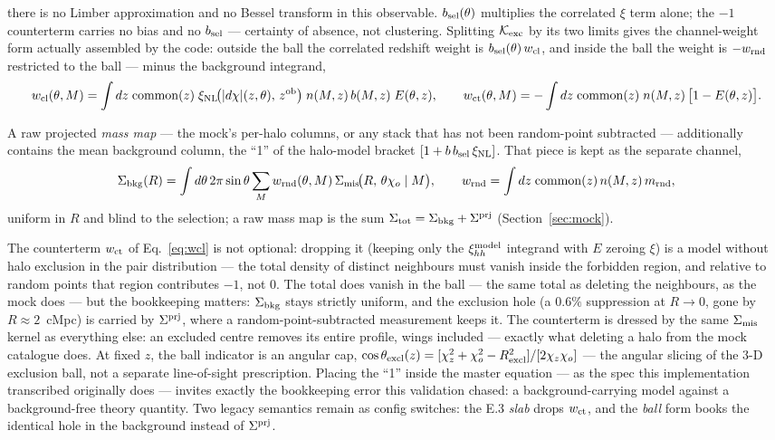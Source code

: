 there is no Limber approximation and no Bessel transform in this
observable. $b_{\rm sel}(\theta)$ multiplies the correlated $\xi$ term alone;
the $-1$ counterterm carries no bias and no $b_{\rm sel}$ --- certainty of
absence, not clustering. Splitting $\mathcal{K}_{\rm exc}$ by its two limits gives the
channel-weight form actually assembled by the code: outside the ball
the correlated redshift weight is $b_{\rm sel}(\theta)\,w_{\rm cl}$, and inside the
ball the weight is $-w_{\rm rnd}$ restricted to the ball --- minus the
background integrand,
\begin{equation}
w_{\rm cl}(\theta, M) = \int dz\;{\rm common}(z)\;
    \xi_{\rm NL}\!\big(|d\chi|(z,\theta),\, z^{\rm ob}\big)\;
    n(M, z)\, b(M, z)\; E(\theta, z),
\qquad
w_{\rm ct}(\theta, M) = -\int dz\;{\rm common}(z)\; n(M, z)\,
    \bigl[1 - E(\theta, z)\bigr].
\label{eq:wcl}
\end{equation}

A raw projected \emph{mass map} --- the mock's per-halo columns, or any
stack that has not been random-point subtracted --- additionally contains
the mean background column, the ``1'' of the halo-model bracket
$[1 + b\,b_{\rm sel}\,\xi_{\rm NL}]$. That piece is kept as the separate 
channel,
\begin{equation}
\Sigma_{\rm bkg}(R) = \int d\theta\, 2\pi\sin\theta
  \sum_M w_{\rm rnd}(\theta, M)\, \Sigma_{\rm mis}\!\big(R,\, \theta\chi_o \mid M\big),
\qquad
w_{\rm rnd} = \int dz\;{\rm common}(z)\, n(M, z)\, m_{\rm rnd},
\label{eq:wrnd}
\end{equation}
uniform in $R$ and blind to the selection; a raw mass map is the sum
$\Sigma_{\rm tot} = \Sigma_{\rm bkg} + \Sigma^{\rm prj}$ (Section~\ref{sec:mock}).

The counterterm $w_{\rm ct}$ of Eq.~\eqref{eq:wcl} is not optional:
dropping it (keeping only the $\xi_{hh}^{\rm model}$ integrand with $E$ zeroing
$\xi$) is a model without halo exclusion in the pair distribution ---
the total density of distinct neighbours must vanish inside the
forbidden region, and relative to random points that region contributes
$-1$, not $0$. The total does vanish in the ball --- the same total as
deleting the neighbours, as the mock does --- but the bookkeeping
matters: $\Sigma_{\rm bkg}$ stays strictly uniform, and the exclusion hole (a
$0.6\%$ suppression at $R \to 0$, gone by $R \approx 2$~cMpc) is
carried by $\Sigma^{\rm prj}$, where a random-point-subtracted measurement keeps
it. The counterterm is dressed by the same $\Sigma_{\rm mis}$ kernel as everything
else: an excluded centre removes its entire profile, wings included ---
exactly what deleting a halo from the mock catalogue does. At fixed
$z$, the ball indicator is an angular cap,
$\cos\theta_{\rm excl}(z) = [\chi_z^2 + \chi_o^2 -
R_{\rm excl}^2]/[2\chi_z\chi_o]$ --- the angular slicing of the 3-D exclusion
ball, not a separate line-of-sight prescription. Placing the ``1''
inside the master equation --- as the spec this implementation
transcribed originally does --- invites exactly the bookkeeping error
this validation chased: a background-carrying model against a
background-free theory quantity. Two legacy semantics remain as config
switches: the E.3 \emph{slab} drops $w_{\rm ct}$, and the \emph{ball}
form books the identical hole in the background instead of $\Sigma^{\rm prj}$.

